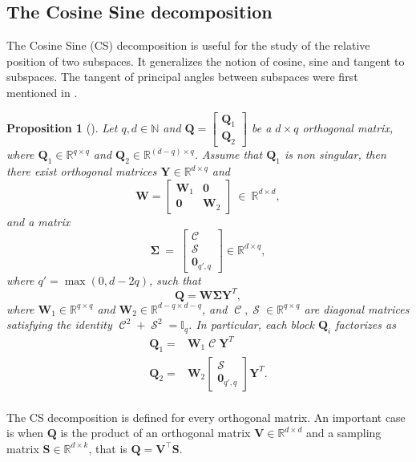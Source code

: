\documentclass[twoside,11pt]{book}
\newtheorem{proposition}{Proposition}
\numberwithin{theorem}{chapter}
\numberwithin{definition}{chapter}
\numberwithin{proposition}{chapter}
\numberwithin{corollary}{chapter}
\numberwithin{example}{chapter}
\numberwithin{lemma}{chapter}
\DeclareMathOperator{\Tran}{\intercal}
\DeclareMathOperator{\Sinmatrix}{\mathcal{S}}
\DeclareMathOperator{\Cosmatrix}{\mathcal{C}}
\begin{document}
\subsection{The Cosine Sine decomposition}
The Cosine Sine (CS) decomposition is useful for the study of the relative position of two subspaces. It generalizes the notion of cosine, sine and tangent to subspaces. The tangent of principal angles between subspaces were first mentioned in \citealp{ZhKn13}.
\begin{proposition}[\citealp{GoVa96}]
Let $q,d \in \mathbb{N}$ and $\bm{Q} =
\left[
\begin{array}{c}
\bm{Q}_{1}  \\
\hline
\bm{Q}_{2}
\end{array}
\right]
$ be a $d\times q$ orthogonal matrix, where $\bm{Q}_{1} \in \mathbb{R}^{q \times q}$ and $\bm{Q}_{2} \in \mathbb{R}^{(d-q)\times q}$. Assume that $\bm{Q}_{1}$ is non singular, then there exist orthogonal matrices $\bm{Y}\in\mathbb{R}^{d \times q}$ and
\begin{equation}
 \bm{W} =
\left[
\begin{array}{c|c}
\bm{W}_{1} & \bm{0} \\
\hline
\bm{0} & \bm{W}_{2}
\end{array}
\right]~\in~\mathbb{R}^{d \times d},
\end{equation}
and a matrix
\begin{equation}
\bm{\Sigma}~=~\left[
\begin{array}{c}
\Cosmatrix \\
\hline
\Sinmatrix \\
\hline
\bm{0}_{q',q}
\end{array}
\right] \in \mathbb{R}^{d \times q},
\end{equation}
where $q' = \max(0,d-2q)$, such that
\begin{equation}
    \bm{Q} = \bm{W}\bm{\Sigma}\bm{Y}^{T},
\end{equation}
where $\bm{W}_{1} \in \mathbb{R}^{q \times q}$ and $\bm{W}_{2} \in \mathbb{R}^{d-q \times d-q}$, and $\Cosmatrix, \Sinmatrix \in \mathbb{R}^{q\times q}$ are diagonal matrices satisfying the identity $\Cosmatrix^{2} + \Sinmatrix^{2} = \mathbb{I}_{q}$.
In particular, each block $\bm{Q}_{i}$ factorizes as
\begin{equation}
\begin{split}
    \bm{Q}_{1} = & \bm{W}_{1}\Cosmatrix\bm{Y}^{T} \\
    \bm{Q}_{2} = & \bm{W}_{2}\left[
\begin{array}{c}
\Sinmatrix \\
\hline
\bm{0}_{q',q}
\end{array}
\right]\bm{Y}^{T} .\\
\end{split}
\end{equation}

\label{CSD_proposition}
\end{proposition}
The CS decomposition is defined for every orthogonal matrix. An important case is when $\bm{Q}$ is the product of an orthogonal matrix $\bm{V} \in \mathbb{R}^{d \times d}$ and a sampling matrix $\bm{S} \in \mathbb{R}^{d \times k}$, that is $\bm{Q} = \bm{V}^{\Tran}\bm{S}$.
\end{document}
